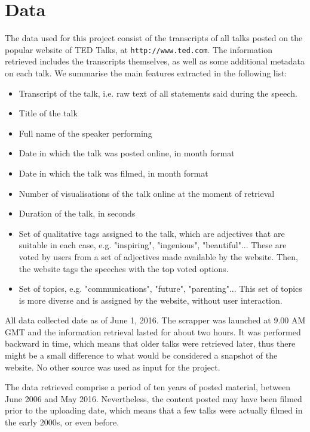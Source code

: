 \documentclass[a4paper, 11pt]{article} %
\begin{document}
\section*{Data}

The data used for this project consist of the transcripts of all talks posted on the  popular website of TED Talks, at \texttt{http://www.ted.com}. The information retrieved includes the transcripts themselves, as well as some additional metadata on each talk. We summarise the main features extracted in the following list:

\begin{itemize}
\item Transcript of the talk, i.e. raw text of all statements said during the speech.
\item Title of the talk
\item Full name of the speaker performing
\item Date in which the talk was posted online, in month format
\item Date in which the talk was filmed, in month format
\item Number of visualisations of the talk online at the moment of retrieval
\item Duration of the talk, in seconds
\item Set of qualitative tags assigned to the talk, which are adjectives that are suitable in each case, e.g. "inspiring", "ingenious", "beautiful"... These are voted by users from a set of adjectives made available by the website. Then, the website tags the speeches with the top voted options.
\item Set of topics, e.g. "communications", "future", "parenting"... This set of topics is more diverse and is assigned by the website, without user interaction.
\end{itemize}

All data collected date as of June 1, 2016. The scrapper was launched at 9.00 AM GMT and the information retrieval lasted for about two hours. It was performed backward in time, which means that older talks were retrieved later, thus there might be a small difference to what would be considered a snapshot of the website. No other source was used as input for the project.

The data retrieved comprise a period of ten years of posted material, between June 2006 and May 2016. Nevertheless, the content posted may have been filmed prior to the uploading date, which means that a few talks were actually filmed in the early 2000s, or even before.
\end{document}
